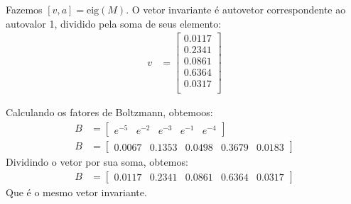 \documentclass[12pt]{article}
\newenvironment{exercise}[2][Exercício]{\begin{trivlist}
\item[\hskip \labelsep {\bfseries #1}\hskip \labelsep {\bfseries #2.}]}{\end{trivlist}}
\begin{document}
\begin{exercise}{2.c}
Fazemos $[v, a] = \text{eig}(M)$. O vetor invariante é autovetor correspondente
ao autovalor 1, dividido pela soma de seus elemento:
\begin{align*}
v &= \begin{bmatrix}
0.0117 \\ 0.2341 \\ 0.0861 \\ 0.6364 \\ 0.0317 \\ 
\end{bmatrix}
\end{align*}
\end{exercise}
 
\begin{exercise}{2.d}
Calculando os fatores de Boltzmann, obtemoos:
\begin{align*}
B &= \begin{bmatrix}
e^{-5} & e^{-2} & e^{-3} & e^{-1} & e^{-4} 
\end{bmatrix} \\
B &= \begin{bmatrix}
0.0067 & 0.1353 & 0.0498 & 0.3679 & 0.0183
\end{bmatrix}
\end{align*}
Dividindo o vetor por sua soma, obtemos:
\begin{align*}
B &= \begin{bmatrix}
0.0117 & 0.2341 & 0.0861 & 0.6364 & 0.0317
\end{bmatrix}
\end{align*}
Que é o mesmo vetor invariante. 
\end{exercise}
\end{document}

